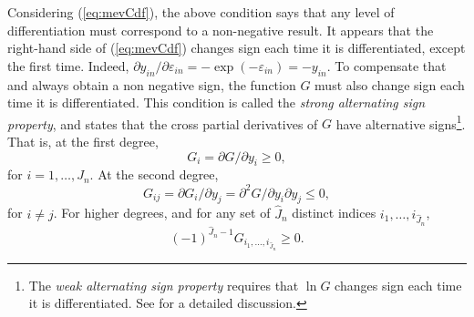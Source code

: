 \documentclass[12pt,a4paper]{article}
\newcommand{\req}[1]{(\ref{#1})}
\begin{document}
\begin{enumerate}
Considering \req{eq:mevCdf}, the above condition says that any level of differentiation must correspond to a non-negative result. 
It appears that the right-hand side of  \req{eq:mevCdf} changes sign each time it is differentiated, except the first time. Indeed, $\partial y_{in} / \partial \varepsilon_{in} = -\exp(-\varepsilon_{in}) = -y_{in}$. To compensate that and always obtain a non negative sign, the function $G$ must also change sign each time it is differentiated. This condition is called the \emph{strong alternating sign property}, and states  that the cross partial derivatives
  of $G$ have alternative signs\footnote{The \emph{weak alternating
  sign property} requires that $\ln G$ changes sign each time it is
  differentiated. See  for a detailed discussion.}. That is, at the first degree, 
\[
G_i = \partial G/ \partial y_i \geq 0,
\]
for $i=1,\ldots,J_n$. At the second degree, 
\[
G_{ij} = \partial G_i/\partial y_j = \partial^2 G/\partial y_i \partial y_j \leq 0,
\]
 for $i\neq j$. For higher degrees,  and for any set of $\widehat{J}_n$
distinct indices $i_1,\dots,i_{\widehat{J}_n}$, 
\begin{equation}
\label{eq:strongAltSignProp}
(-1)^{\widehat{J}_n-1} G_{i_1,\ldots,i_{\widehat{J}_n}} \geq 0.
\end{equation}
\end{enumerate}
\end{document}
